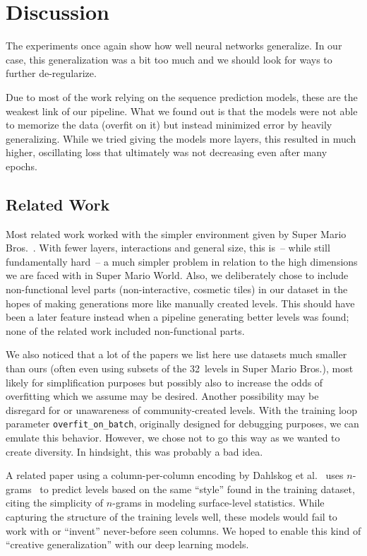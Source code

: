 \section{Discussion}

The experiments once again show how well neural networks generalize.
In our case, this generalization was a bit too much and we should look
for ways to further de-regularize.

Due to most of the work relying on the sequence prediction models,
these are the weakest link of our pipeline. What we found out is that
the models were not able to memorize the data (overfit on it) but
instead minimized error by heavily generalizing. While we tried giving
the models more layers, this resulted in much higher, oscillating loss
that ultimately was not decreasing even after many epochs.

\subsection{Related Work}

Most related work worked with the simpler environment given by Super
Mario Bros.~\cite{SuperMarioBros2019}. With fewer layers, interactions
and general size, this is~-- while still fundamentally hard~-- a much
simpler problem in relation to the high dimensions we are faced with
in Super Mario World. Also, we deliberately chose to include
non-functional level parts (non-interactive, cosmetic tiles) in our
dataset in the hopes of making generations more like manually created
levels. This should have been a later feature instead when a pipeline
generating better levels was found; none of the related work included
non-functional parts.

We also noticed that a lot of the papers we list here use datasets
much smaller than ours (often even using subsets of the 32~levels in
Super Mario Bros.), most likely for simplification purposes but
possibly also to increase the odds of overfitting which we assume may
be desired. Another possibility may be disregard for or unawareness of
community-created levels. With the training loop parameter
\texttt{overfit\_on\_batch}, originally designed for debugging
purposes, we can emulate this behavior. However, we chose not to go
this way as we wanted to create diversity. In hindsight, this was
probably a bad idea.

A related paper using a column-per-column encoding by Dahlskog et
al.~\cite{dahlskogLinearLevelsNgrams2014} uses
$n$-grams~\cite{Ngram2019} to predict levels based on the same
``style'' found in the training dataset, citing the simplicity of
$n$-grams in modeling surface-level statistics. While capturing the
structure of the training levels well, these models would fail to work
with or ``invent'' never-before seen columns. We hoped to enable this
kind of ``creative generalization'' with our deep learning models.
\medskip

